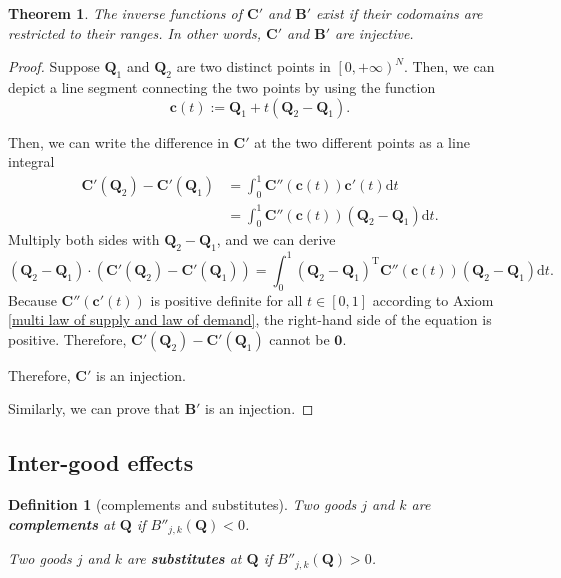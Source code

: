 \documentclass{article}
\newtheorem{theorem}{Theorem}[subsection]
\newtheorem{definition}{Definition}[subsection]
\begin{document}
\begin{theorem}
The inverse functions of $\mathbf C'$ and $\mathbf B'$ exist if their codomains are restricted to their ranges.
In other words, $\mathbf C'$ and $\mathbf B'$ are injective.
\end{theorem}
\begin{proof}
Suppose $\mathbf Q_1$ and $\mathbf Q_2$ are two distinct points in $\left[0,+\infty\right)^N$.
Then, we can depict a line segment connecting the two points by using the function
$$\mathbf c\!\left(t\right):=\mathbf Q_1+t\left(\mathbf Q_2-\mathbf Q_1\right).$$

Then, we can write the difference in $\mathbf C'$ at the two different points
as a line integral
\begin{align*}
\mathbf C'\!\left(\mathbf Q_2\right)-\mathbf C'\!\left(\mathbf Q_1\right)&=
\int_0^1\mathbf C''\!\left(\mathbf c\!\left(t\right)\right)\mathbf c'\!\left(t\right)\mathrm dt\\
&=\int_0^1\mathbf C''\!\left(\mathbf c\!\left(t\right)\right)\left(\mathbf Q_2-\mathbf Q_1\right)\mathrm dt.
\end{align*}
Multiply both sides with $\mathbf Q_2-\mathbf Q_1$, and we can derive
$$\left(\mathbf Q_2-\mathbf Q_1\right)\cdot
\left(\mathbf C'\!\left(\mathbf Q_2\right)-\mathbf C'\!\left(\mathbf Q_1\right)\right)=
\int_0^1\left(\mathbf Q_2-\mathbf Q_1\right)^\mathrm T
\mathbf C''\!\left(\mathbf c\!\left(t\right)\right)\left(\mathbf Q_2-\mathbf Q_1\right)\mathrm dt.$$
Because $\mathbf C''\!\left(\mathbf c'\!\left(t\right)\right)$ is positive definite
for all $t\in\left[0,1\right]$ according to Axiom \ref{multi law of supply and law of demand},
the right-hand side of the equation is positive.
Therefore, $\mathbf C'\!\left(\mathbf Q_2\right)-\mathbf C'\!\left(\mathbf Q_1\right)$ cannot be $\mathbf 0$.

Therefore, $\mathbf C'$ is an injection.

Similarly, we can prove that $\mathbf B'$ is an injection.
\end{proof}

\subsection{Inter-good effects}

\begin{definition}[complements and substitutes]
Two goods $j$ and $k$ are \textbf{complements} at $\mathbf Q$ if $B''_{j,k}\!\left(\mathbf Q\right)<0$.

Two goods $j$ and $k$ are \textbf{substitutes} at $\mathbf Q$ if $B''_{j,k}\!\left(\mathbf Q\right)>0$.
\end{definition}
\end{document}
